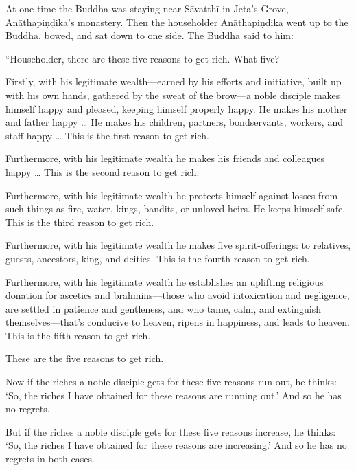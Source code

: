 \documentclass[12pt,openany]{book}%
\begin{document}
At one time the Buddha was staying near \textsanskrit{Sāvatthī} in Jeta’s Grove, \textsanskrit{Anāthapiṇḍika}’s monastery. Then the householder \textsanskrit{Anāthapiṇḍika} went up to the Buddha, bowed, and sat down to one side. The Buddha said to him: 

“Householder, there are these five reasons to get rich. What five? 

Firstly, with his legitimate wealth—earned by his efforts and initiative, built up with his own hands, gathered by the sweat of the brow—a noble disciple makes himself happy and pleased, keeping himself properly happy. He makes his mother and father happy … He makes his children, partners, bondservants, workers, and staff happy … This is the first reason to get rich. 

Furthermore, with his legitimate wealth he makes his friends and colleagues happy … This is the second reason to get rich. 

Furthermore, with his legitimate wealth he protects himself against losses from such things as fire, water, kings, bandits, or unloved heirs. He keeps himself safe. This is the third reason to get rich. 

Furthermore, with his legitimate wealth he makes five spirit-offerings: to relatives, guests, ancestors, king, and deities. This is the fourth reason to get rich. 

Furthermore, with his legitimate wealth he establishes an uplifting religious donation for ascetics and brahmins—those who avoid intoxication and negligence, are settled in patience and gentleness, and who tame, calm, and extinguish themselves—that’s conducive to heaven, ripens in happiness, and leads to heaven. This is the fifth reason to get rich. 

These are the five reasons to get rich. 

Now if the riches a noble disciple gets for these five reasons run out, he thinks: ‘So, the riches I have obtained for these reasons are running out.’ And so he has no regrets. 

But if the riches a noble disciple gets for these five reasons increase, he thinks: ‘So, the riches I have obtained for these reasons are increasing.’ And so he has no regrets in both cases. 
\end{document}
